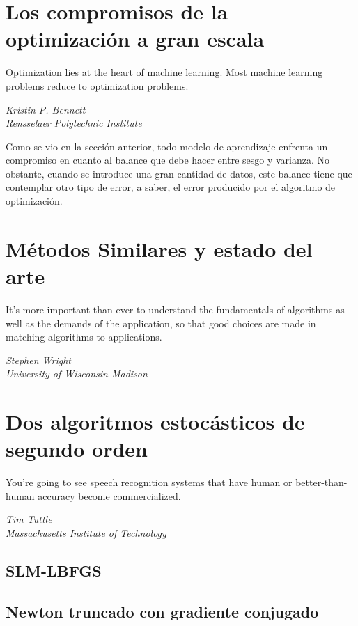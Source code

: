\documentclass{book}
\theoremstyle{plain}
\theoremstyle{definition}
\theoremstyle{remark}
\begin{document}


\chapter{Los compromisos de la optimización a gran escala}



\epigraph{Optimization lies at the heart of machine learning. Most machine learning problems reduce
to optimization problems.}{\textit{Kristin P. Bennett \\ Rensselaer Polytechnic Institute}}
\newpage

Como se vio en la sección anterior, todo modelo de aprendizaje enfrenta un compromiso en cuanto al balance que debe hacer entre sesgo y varianza. No obstante, cuando se introduce una gran cantidad de datos, este balance tiene que contemplar otro tipo de error, a saber, el error producido por el algoritmo de optimización. 



\chapter{Métodos Similares y estado del arte}

\epigraph{It’s more important than ever to understand the fundamentals of
algorithms as well as the demands of the application, so that good
choices are made in matching algorithms to applications.}{\textit{Stephen Wright \\ University of Wisconsin-Madison}}
\newpage



\chapter{Dos algoritmos estocásticos de segundo orden}

\epigraph{You're going to see speech recognition systems that have human or better-than-human accuracy become commercialized.}{\textit{Tim Tuttle \\ Massachusetts Institute of Technology}}

\newpage

\section{SLM-LBFGS}

\section{Newton truncado con gradiente conjugado}
\end{document}
